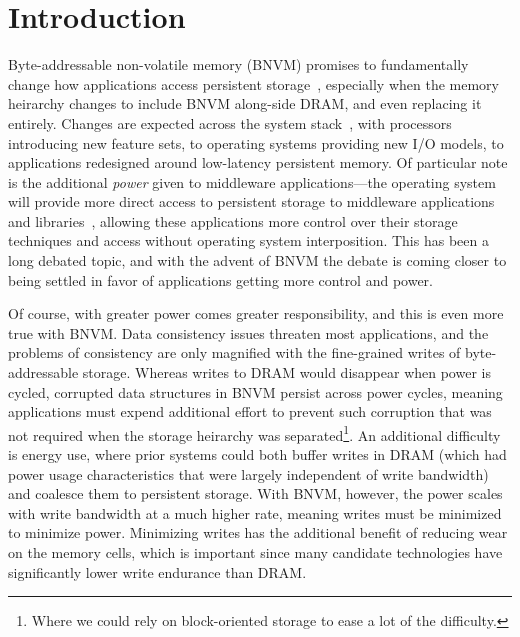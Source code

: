 \section{Introduction}

Byte-addressable non-volatile memory (BNVM) promises to fundamentally change
how applications access persistent
storage~\cite{lee_architecting_2009,fox:2001feram,sttram,wong2010phase,intel3dxpoint},
especially when the memory heirarchy changes to include BNVM along-side DRAM,
and even replacing it entirely.
Changes are expected across the system stack~\cite{condit:sosp09}, with
processors introducing new feature sets, to operating systems providing new I/O
models, to applications redesigned around low-latency persistent memory. Of
particular note is the additional \textit{power} given to middleware
applications---the operating system will provide more direct access to
persistent storage to middleware applications and
libraries~\cite{bittman-ssrctr-17-01}, allowing these applications more control
over their storage techniques and access without operating system interposition.
This has been a long debated topic, and with the advent of BNVM the debate is
coming closer to being settled in favor of applications getting more control and
power.

Of course, with greater power comes greater responsibility, and this is even
more true with BNVM. Data consistency issues threaten most applications, and the
problems of consistency are only magnified with the fine-grained writes of
byte-addressable storage. Whereas writes to DRAM would disappear when power is
cycled, corrupted data structures in BNVM persist across power cycles, meaning
applications must expend additional effort to prevent such corruption that was
not required when the storage heirarchy was separated\footnote{Where we could
rely on block-oriented storage to ease a lot of the difficulty.}. An additional
difficulty is energy use, where prior systems could both buffer writes in DRAM
(which had power usage characteristics that were largely independent of write
bandwidth) and coalesce them to persistent storage. With BNVM, however, the
power scales with write bandwidth at a much higher rate, meaning writes must be
minimized to minimize power. Minimizing writes has the additional benefit of
reducing wear on the memory cells, which is important since many candidate
technologies have significantly lower write endurance than DRAM.

